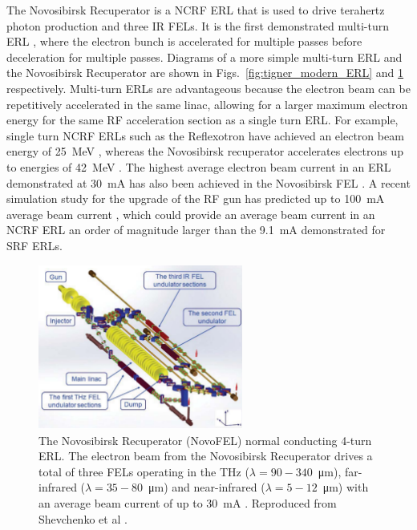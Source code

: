 \documentclass[../main.tex]{subfiles}
\begin{document}
The Novosibirsk Recuperator is a NCRF ERL that is used to drive terahertz photon production and three IR FELs. It is the first demonstrated multi-turn ERL \cite{gavrilov2007status}, where the electron bunch is accelerated for multiple passes before deceleration for multiple passes. Diagrams of a more simple multi-turn ERL and the Novosibirsk Recuperator are shown in Figs.~\ref{fig:tigner_modern_ERL} and \ref{fig:novosibirsk_recuperator} respectively. Multi-turn ERLs are advantageous because the electron beam can be repetitively accelerated in the same linac, allowing for a larger maximum electron energy for the same RF acceleration section as a single turn ERL. For example, single turn NCRF ERLs such as the Reflexotron have achieved an electron beam energy of 25~\si{\mega\electronvolt} \cite{schriber1977experimental}, whereas the Novosibirsk recuperator accelerates electrons up to energies of 42~\si{\mega\electronvolt} \cite{shevchenko2020novosibirsk}. The highest average electron beam current in an ERL demonstrated at 30~\si{\milli\ampere} has also been achieved in the Novosibirsk FEL \cite{gavrilov2007status}. A recent simulation study for the upgrade of the RF gun has predicted up to 100~\si{\milli\ampere} average beam current \cite{matveev2020simulation}, which could provide an average beam current in an NCRF ERL an order of magnitude larger than the 9.1~\si{\milli\ampere} \cite{neil2006jlab} demonstrated for SRF ERLs.  
\begin{figure}[!h]
\centering
\includegraphics[width=0.6\textwidth]{Figures/Introduction/Novosibirsk_Recuperator.pdf}
\caption{The Novosibirsk Recuperator (NovoFEL) normal conducting 4-turn ERL. The electron beam from the Novosibirsk Recuperator drives a total of three FELs operating in the \si{\tera\hertz} ($\lambda = 90-340$~\si{\micro\meter}), far-infrared ($\lambda = 35 - 80$~\si{\micro\meter}) and near-infrared ($\lambda = 5 - 12$~\si{\micro\meter}) \cite{shevchenko2020novosibirsk} with an average beam current of up to 30~\si{\milli\ampere} \cite{gavrilov2007status}. Reproduced from Shevchenko et al \cite{shevchenko2020novosibirsk}. }
\label{fig:novosibirsk_recuperator}
\end{figure}
\end{document}
